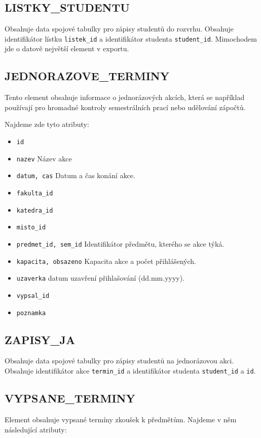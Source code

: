 \documentclass[11pt,twoside,a4paper]{book}
\begin{document}
\subsection{LISTKY\_STUDENTU}
Obsahuje data spojové tabulky pro zápisy studentů do rozvrhu. Obsahuje identifikátor lístku \texttt{listek\_id} a identifikátor studenta \texttt{student\_id}. Mimochodem jde o datově největší element v exportu.

\subsection{JEDNORAZOVE\_TERMINY}
Tento element obsahuje informace o jednorázových akcích, která se například používají pro hromadné kontroly semestrálních prací nebo udělování zápočtů.

Najdeme zde tyto atributy:
\begin{itemize}
\item \texttt{id}
\item \texttt{nazev} Název akce
\item \texttt{datum, cas} Datum a čas konání akce.
\item \texttt{fakulta\_id}
\item \texttt{katedra\_id}
\item \texttt{misto\_id}
\item \texttt{predmet\_id, sem\_id} Identifikátor předmětu, kterého se akce týká.
\item \texttt{kapacita, obsazeno} Kapacita akce a počet přihlášených.
\item \texttt{uzaverka} datum uzavření přihlašování (dd.mm.yyyy).
\item \texttt{vypsal\_id}
\item \texttt{poznamka}
\end{itemize}

\subsection{ZAPISY\_JA}
Obsahuje data spojové tabulky pro zápisy studentů na jednorázovou akci. Obsahuje identifikátor akce \texttt{termin\_id} a identifikátor studenta \texttt{student\_id} a \texttt{id}.

\subsection{VYPSANE\_TERMINY}
Element obsahuje vypsané termíny zkoušek k předmětům. Najdeme v něm následující atributy:
\end{document}

